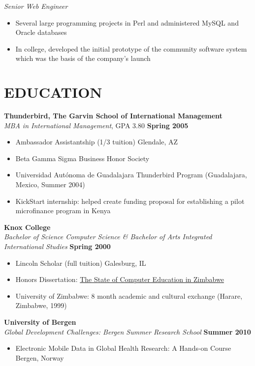 \documentclass{res}
\begin{document}
\begin{resume}
\emph{Senior Web Engineer}
 \begin{itemize} \itemsep -2pt
	\item Several large programming projects in Perl and administered MySQL and Oracle databases 
	\item In college, developed the initial prototype of the community software system which was the basis of the company’s launch 
 \end{itemize}

\section{EDUCATION} 
\vspace{8pt} 
\textbf{Thunderbird, The Garvin School of International Management}  \\
\emph{MBA in International Management}, GPA 3.80 \hfill \textbf{Spring 2005}
   \begin{itemize} \itemsep -2pt %
		\item Ambassador Assistantship (1/3 tuition)   \hfill Glendale, AZ
		\item Beta Gamma Sigma Business Honor Society
		\item Universidad Autónoma de Guadalajara Thunderbird Program (Guadalajara, Mexico, Summer 2004)  
		\item KickStart internship: helped create funding proposal for establishing a pilot microfinance program in Kenya
	\end{itemize} \vspace{-6pt}

	\vspace{8pt} 
	\textbf{Knox College}  \\
	\emph{Bachelor of Science Computer Science \& Bachelor of Arts Integrated International Studies} \hfill \textbf{Spring 2000}
	   \begin{itemize} \itemsep -2pt %
			\item Lincoln Scholar (full tuition)   \hfill Galesburg, IL
			\item Honors Dissertation: \underline{The State of Computer Education in Zimbabwe} 
			\item University of Zimbabwe: 8 month academic and cultural exchange (Harare, Zimbabwe, 1999)
		\end{itemize}
		
	\vspace{8pt} 
	\textbf{University of Bergen}  \\
	\emph{Global Development Challenges: Bergen Summer Research School} \hfill \textbf{Summer 2010}
	   \begin{itemize} \itemsep -2pt %
			\item Electronic Mobile Data in Global Health Research: A Hands-on Course \hfill Bergen, Norway
		\end{itemize}
\vspace{0.2in}
\newpage


\end{resume}
\end{document}
